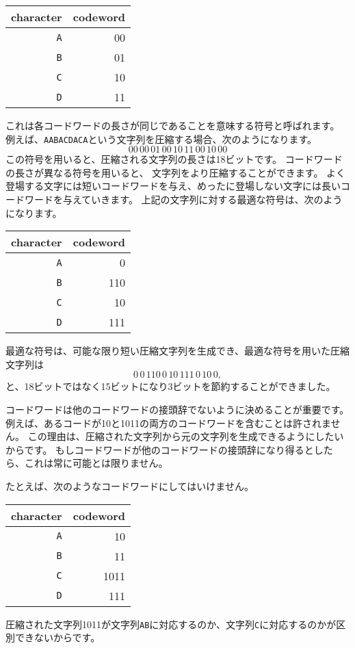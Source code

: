 \begin{center}
\begin{tabular}{rr}
character & codeword \\
\hline
\texttt{A} & 00 \\
\texttt{B} & 01 \\
\texttt{C} & 10 \\
\texttt{D} & 11 \\
\end{tabular}
\end{center}
これは各コードワードの長さが同じであることを意味する符号と呼ばれます。
例えば、\texttt{AABACDACA}という文字列を圧縮する場合、次のようになります。
\[00\,00\,01\,00\,10\,11\,00\,10\,00\]
この符号を用いると、圧縮される文字列の長さは18ビットです。
コードワードの長さが異なる符号を用いると、
文字列をより圧縮することができます。
よく登場する文字には短いコードワードを与え、めったに登場しない文字には長いコードワードを与えていきます。
上記の文字列に対する最適な符号は、次のようになります。

\begin{center}
\begin{tabular}{rr}
character & codeword \\
\hline
\texttt{A} & 0 \\
\texttt{B} & 110 \\
\texttt{C} & 10 \\
\texttt{D} & 111 \\
\end{tabular}
\end{center}
最適な符号は、可能な限り短い圧縮文字列を生成でき、最適な符号を用いた圧縮文字列は
\[0\,0\,110\,0\,10\,111\,0\,10\,0,\]
と、18ビットではなく15ビットになり3ビットを節約することができました。

コードワードは他のコードワードの接頭辞でないように決めることが重要です。
例えば、あるコードが10と1011の両方のコードワードを含むことは許されません。
この理由は、圧縮された文字列から元の文字列を生成できるようにしたいからです。
もしコードワードが他のコードワードの接頭辞になり得るとしたら、これは常に可能とは限りません。

たとえば、次のようなコードワードにしてはいけません。
\begin{center}
\begin{tabular}{rr}
character & codeword \\
\hline
\texttt{A} & 10 \\
\texttt{B} & 11 \\
\texttt{C} & 1011 \\
\texttt{D} & 111 \\
\end{tabular}
\end{center}
圧縮された文字列1011が文字列\texttt{AB}に対応するのか、文字列\texttt{C}に対応するのかが区別できないからです。

